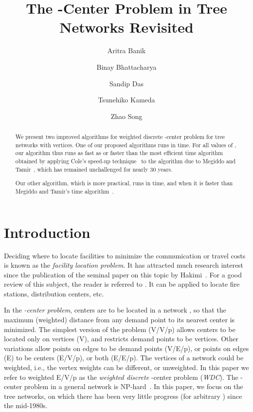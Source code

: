 \documentclass{llncs}
\begin{document}
\title{The -Center Problem in Tree Networks Revisited}\author{Aritra Banik 
\and Binay Bhattacharya
\and Sandip Das
\and Tsunehiko Kameda 
\and Zhao Song 
}

\maketitle

\begin{abstract}
We present two improved algorithms for weighted discrete -center problem
for tree networks with  vertices.
One of our proposed algorithms runs in  time.
For all values of ,
our algorithm thus runs as fast as or faster than the most efficient  time
algorithm obtained by applying Cole's speed-up technique~\cite{cole1987}
to the algorithm due to Megiddo and Tamir~\cite{megiddo1983c},
which has remained unchallenged for nearly 30 years.

Our other algorithm,
which is more practical,
 runs in  time,
and when  it is faster than Megiddo and Tamir's 
time algorithm~\cite{megiddo1983c}.
\end{abstract}


\section{Introduction}\label{sec:introduction}
Deciding where to locate facilities  to minimize the communication or travel costs
is known as the {\em facility location problem}.
It has attracted much research interest since the publication of
the seminal paper on this topic by Hakimi~\cite{hakimi1964}.
For a good review of this subject, the reader is referred to \cite{hale2003}.
It can be applied to locate fire stations, distribution centers, etc.

In the {\em -center problem},
 centers are to be located in a network ,
so that the maximum (weighted) distance from
any demand point to its nearest center is minimized.
The simplest version of the problem (V/V/p) allows centers to be
located only on vertices (V), and
restricts demand points to be vertices.
Other variations allow points on edges to be demand points
(V/E/p), or points on edges (E) to be centers (E/V/p), or both (E/E/p).
The vertices of a network could be weighted,
i.e., the vertex weights can be different,
or unweighted.
In this paper we refer to weighted E/V/p as the {\em weighted discrete} -center problem ({\em WDC}).
The -center problem in a general network is NP-hard~\cite{kariv1979b}.
In this paper, we focus on  the tree networks,
on which there has been very little progress (for arbitrary ) since the mid-1980s.
\end{document}

